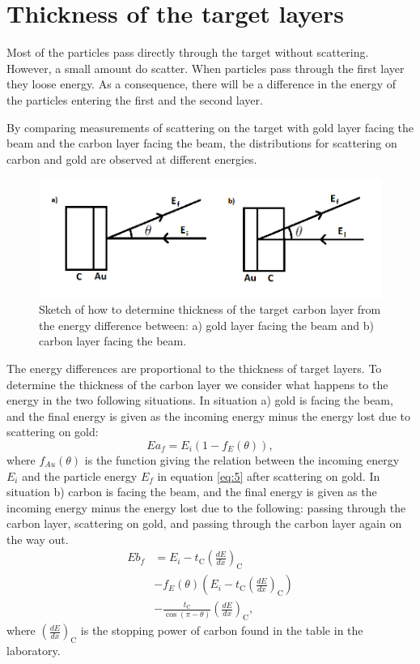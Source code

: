 \section{Thickness of the target layers} 
Most of the particles pass directly through the target without scattering. However, a small amount do scatter. When particles pass through the first layer they loose energy. As a consequence, there will be a difference in the energy of the particles entering the first and the second layer. 

By comparing measurements of scattering on the target with gold layer facing the beam and the carbon layer facing the beam, the distributions for scattering on carbon and gold are observed at different energies. 

\begin{figure}[h]
\centering
\includegraphics[width=0.99\columnwidth]{tykkelse.png}
\caption{Sketch of how to determine thickness of the target carbon layer from the energy difference between: a) gold layer facing the beam and b) carbon layer facing the beam.}
\label{fig_sketch_thickness}
\end{figure}


The energy differences are proportional to the thickness of target layers. To determine the thickness of the carbon layer we consider what happens to the energy in the two following situations. In situation a) gold is facing the beam, and the final energy is given as the incoming energy minus the energy lost due to scattering on gold:
\begin{equation*}
Ea_f = E_i (1-f_E(\theta)), 
\end{equation*}
where $f_{Au}(\theta)$ is the function giving the relation between the incoming energy $E_i$ and the particle energy $E_f$ in equation \cref{eq:5} after scattering on gold. 
In situation b) carbon is facing the beam, and the final energy is given as the incoming energy minus the energy lost due to the following: passing through the carbon layer, scattering on gold, and passing through the carbon layer again on the way out. 
\begin{align*}
Eb_f &= E_i - t_\mathrm{C} \left(\frac{dE}{dx}\right)_\mathrm{C} 
\\ &- f_E(\theta) \left(E_i - t_\mathrm{C} \left(\frac{dE}{dx}\right)_\mathrm{C} \right) \\ &- \frac{t_\mathrm{C}}{\cos(\pi-\theta)} \left(\frac{dE}{dx}\right)_\mathrm{C}, 
\end{align*}
where $\left(\frac{dE}{dx}\right)_\mathrm{C}$ is the stopping power of carbon found in the table in the laboratory.

